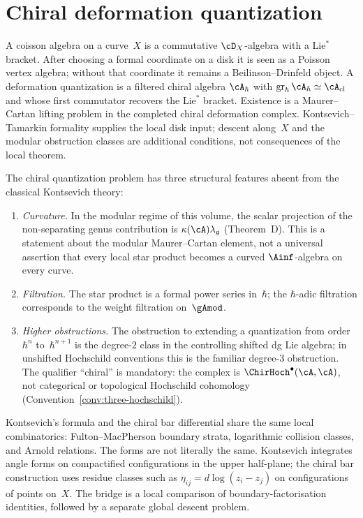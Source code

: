 \chapter{Chiral deformation quantization}
\label{ch:chiral-deformation}
\label{chap:chiral-deformation}


A coisson algebra on a curve~$X$ is a commutative $\cD_X$-algebra with
a Lie$^*$ bracket. After choosing a formal coordinate on a disk it is
seen as a Poisson vertex algebra; without that coordinate it remains a
Beilinson--Drinfeld object. A deformation quantization is a filtered
chiral algebra $\cA_\hbar$ with
$\operatorname{gr}_\hbar \cA_\hbar \simeq \cA_{\mathrm{cl}}$ and whose
first commutator recovers the Lie$^*$ bracket. Existence is a
Maurer--Cartan lifting problem in the completed chiral deformation
complex. Kontsevich--Tamarkin formality supplies the local disk input;
descent along~$X$ and the modular obstruction classes are additional
conditions, not consequences of the local theorem.

The chiral quantization problem has three structural features absent
from the classical Kontsevich theory:
\begin{enumerate}[label=\textup{(\roman*)}]
\item \emph{Curvature.} In the modular regime of this volume, the
 scalar projection of the non-separating genus contribution is
 $\kappa(\cA)\lambda_g$ (Theorem~D). This is a statement about the
 modular Maurer--Cartan element, not a universal assertion that every
 local star product becomes a curved $\Ainf$-algebra on every curve.
\item \emph{Filtration.} The star product is a formal power series
 in~$\hbar$; the $\hbar$-adic filtration corresponds to the weight
 filtration on~$\gAmod$.
\item \emph{Higher obstructions.} The obstruction to extending a
 quantization from order~$\hbar^n$ to~$\hbar^{n+1}$ is the degree-$2$
 class in the controlling shifted dg Lie algebra; in unshifted
 Hochschild conventions this is the familiar degree-$3$ obstruction.
 The qualifier ``chiral'' is mandatory: the complex is
 $\ChirHoch^\bullet(\cA,\cA)$, not categorical or topological
 Hochschild cohomology (Convention~\ref{conv:three-hochschild}).
\end{enumerate}
Kontsevich's formula and the chiral bar differential share the same
local combinatorics: Fulton--MacPherson boundary strata, logarithmic
collision classes, and Arnold relations. The forms are not literally
the same. Kontsevich integrates angle forms on compactified
configurations in the upper half-plane; the chiral bar construction
uses residue classes such as $\eta_{ij}=d\log(z_i-z_j)$ on
configurations of points on~$X$. The bridge is a local comparison of
boundary-factorisation identities, followed by a separate global
descent problem.

